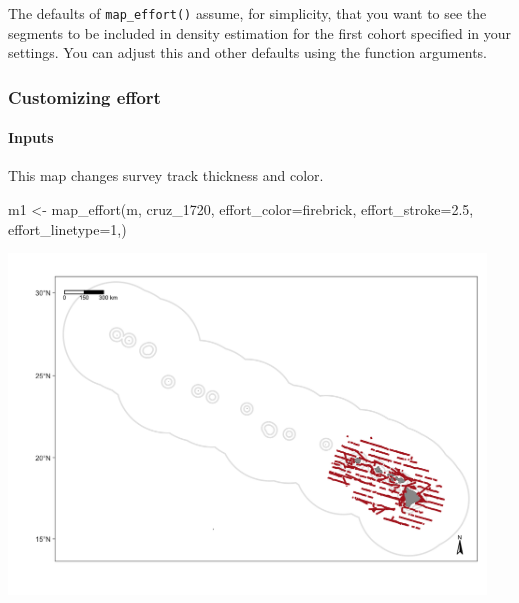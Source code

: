 \documentclass[
]{book}
\newenvironment{Shaded}{\begin{snugshade}}{\end{snugshade}}
\newcommand{\AttributeTok}[1]{\textcolor[rgb]{0.77,0.63,0.00}{#1}}
\newcommand{\DecValTok}[1]{\textcolor[rgb]{0.00,0.00,0.81}{#1}}
\newcommand{\FloatTok}[1]{\textcolor[rgb]{0.00,0.00,0.81}{#1}}
\newcommand{\FunctionTok}[1]{\textcolor[rgb]{0.00,0.00,0.00}{#1}}
\newcommand{\NormalTok}[1]{#1}
\newcommand{\OtherTok}[1]{\textcolor[rgb]{0.56,0.35,0.01}{#1}}
\newcommand{\StringTok}[1]{\textcolor[rgb]{0.31,0.60,0.02}{#1}}
\begin{document}
The defaults of \texttt{map\_effort()} assume, for simplicity, that you want to see the segments to be included in density estimation for the first cohort specified in your settings. You can adjust this and other defaults using the function arguments.

\hypertarget{customizing-effort}{%
\subsubsection*{Customizing effort}\label{customizing-effort}}

\hypertarget{inputs}{%
\paragraph*{Inputs}\label{inputs}}

This map changes survey track thickness and color.

\begin{Shaded}
\begin{Highlighting}[]
\NormalTok{m1 }\OtherTok{\textless{}{-}} \FunctionTok{map\_effort}\NormalTok{(m, }
\NormalTok{                cruz\_1720,}
                \AttributeTok{effort\_color=}\StringTok{\textquotesingle{}firebrick\textquotesingle{}}\NormalTok{,}
                \AttributeTok{effort\_stroke=}\FloatTok{2.5}\NormalTok{,}
                \AttributeTok{effort\_linetype=}\DecValTok{1}\NormalTok{,)}
\end{Highlighting}
\end{Shaded}

\includegraphics[width=0.95\textwidth,height=\textheight]{img/map_tracks2.png}
\end{document}
